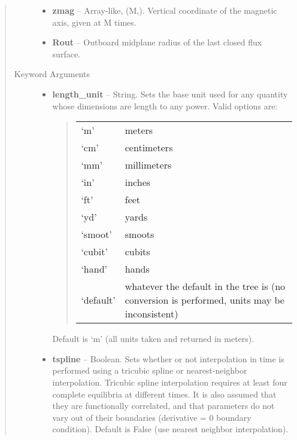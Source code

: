 \documentclass[letterpaper,10pt,english]{sphinxmanual}
\begin{document}
\begin{fulllineitems}
\begin{quote}
\begin{description}
\begin{itemize}
\item {} 
\textbf{zmag} --
Array-like, (M,).
Vertical coordinate of the magnetic axis, given at M times.

\item {} 
\textbf{Rout} --
Outboard midplane radius of the last closed flux surface.

\end{itemize}

\item[{Keyword Arguments}] \leavevmode\begin{itemize}
\item {} 
\textbf{length\_unit} --
String.
Sets the base unit used for any quantity whose
dimensions are length to any power. Valid options are:
\begin{quote}

\begin{tabulary}{\linewidth}{|L|L|}
\hline

`m'
 & 
meters
\\

`cm'
 & 
centimeters
\\

`mm'
 & 
millimeters
\\

`in'
 & 
inches
\\

`ft'
 & 
feet
\\

`yd'
 & 
yards
\\

`smoot'
 & 
smoots
\\

`cubit'
 & 
cubits
\\

`hand'
 & 
hands
\\

`default'
 & 
whatever the default in the tree is (no conversion is performed, units may be inconsistent)
\\
\hline\end{tabulary}

\end{quote}

Default is `m' (all units taken and returned in meters).

\item {} 
\textbf{tspline} --
Boolean.
Sets whether or not interpolation in time is
performed using a tricubic spline or nearest-neighbor
interpolation. Tricubic spline interpolation requires at least
four complete equilibria at different times. It is also assumed
that they are functionally correlated, and that parameters do
not vary out of their boundaries (derivative = 0 boundary
condition). Default is False (use nearest neighbor interpolation).


\end{itemize}
\end{description}
\end{quote}
\end{fulllineitems}
\end{document}

